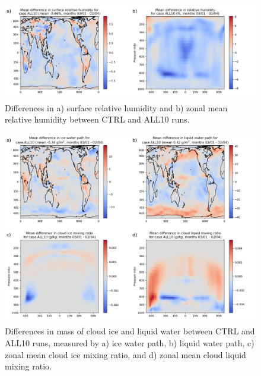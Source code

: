 \documentclass [11pt, proquest] {uwthesis}[2020/02/24]
\begin{document}
\begin{figure}
    \centering
    \includegraphics[width=6.5in]{Figure2.png}
    \caption[Differences in relative humidity between CTRL and ALL10 runs]{Differences in a) surface relative humidity and b) zonal mean relative humidity between CTRL and ALL10 runs.}
    \label{fig:all10-relhum-map}
\end{figure}

\begin{figure}
    \centering
    \includegraphics[width=6.5in]{Figure3.png}
    \caption[Differences in cloud mass between CTRL and ALL10 runs]{Differences in mass of cloud ice and liquid water between CTRL and ALL10 runs, measured by a) ice water path, b) liquid water path, c) zonal mean cloud ice mixing ratio, and d) zonal mean cloud liquid mixing ratio.}
    \label{fig:all10-wp-map}
\end{figure}
\end{document}
